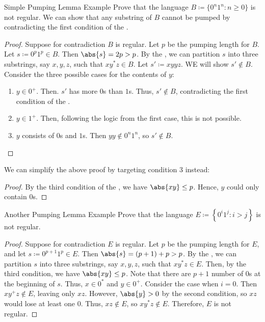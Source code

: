 \documentclass[12pt]{report}
\begin{document}
\begin{exbox}{Simple Pumping Lemma Example}{}
    Prove that the language $B \coloneq \{ 0^n 1^n : n \geq 0 \}$ is not regular.
    \tcblower
    We can show that any substring of $B$ cannot be pumped by contradicting the first condition of the .
    \begin{proof}
        Suppose for contradiction $B$ is regular. Let $p$ be the pumping length for $B$. Let $s \coloneq 0^p1^p \in B$. Then $\abs{s} = 2p > p$. By the , we can partition $s$ into three substrings, say $x,y,z$, such that $x  y^*  z \in B$. Let $s\prime \coloneq x  y  y  z$. WE will show $s\prime \notin B$. Consider the three possible cases for the contents of $y$:
        \begin{enumerate}
            \item $y \in 0^+$. Then. $s\prime$ has more $0$s than $1$s. Thus, $s\prime \notin B$, contradicting the first condition of the .
            \item $y \in 1^+$. Then, following the logic from the first case, this is not possible.
            \item $y$ consists of $0$s and $1$s. Then $y  y \notin 0^n1^n$, so $s \prime \notin B$.
        \end{enumerate}
    \end{proof}

    We can simplify the above proof by targeting condition 3 instead:
    \begin{proof}
        By the third condition of the , we have $\abs{x  y} \leq p$. Hence, $y$ could only contain $0$s.
    \end{proof}
\end{exbox}

\begin{exbox}{Another Pumping Lemma Example}{}
    Prove that the language $E \coloneq \left\{ 0^i 1^j : i > j \right\}$ is not regular.
    \tcblower
    \begin{proof}
        Suppose for contradiction $E$ is regular. Let $p$ be the pumping length for $E$, and let $s \coloneq 0^{p+1}1^p \in E$. Then $\abs{s} = (p+1) + p > p$. By the , we can partition $s$ into three substrings, say $x,y,z$, such that $x  y^*  z \in E$. Then, by the third condition, we have $\abs{x  y} \leq p$. Note that there are $p+1$ number of $0$s at the beginning of $s$. Thus, $x \in 0^*$ and $y \in 0^+$. Consider the case when $i = 0$. Then $x  y^+  z \notin E$, leaving only $x  z$. However, $\abs{y} > 0$ by the second condition, so $x  z$ would lose at least one $0$. Thus, $x  z \notin E$, so $x  y^*  z \notin E$. Therefore, $E$ is not regular.
    \end{proof}
\end{exbox}
\end{document}
